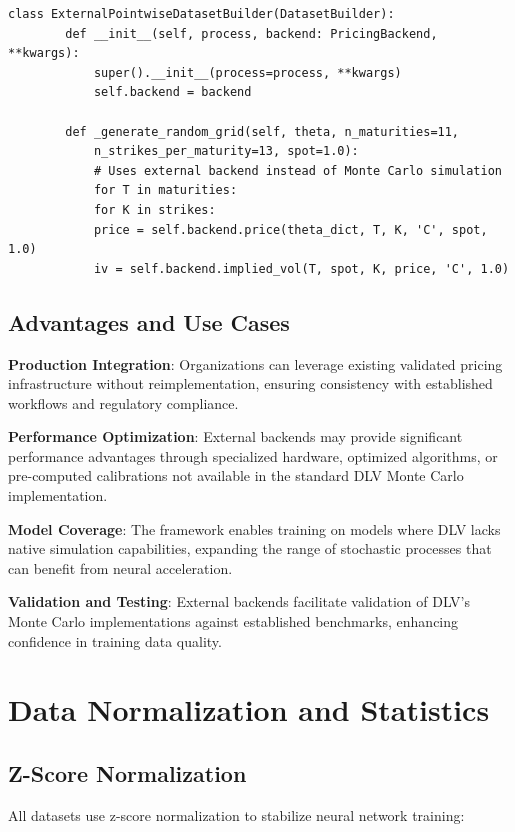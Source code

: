	\begin{lstlisting}[style=cleanpy]
		class ExternalPointwiseDatasetBuilder(DatasetBuilder):
		def __init__(self, process, backend: PricingBackend, **kwargs):
			super().__init__(process=process, **kwargs)
			self.backend = backend
		
		def _generate_random_grid(self, theta, n_maturities=11, 
			n_strikes_per_maturity=13, spot=1.0):
			# Uses external backend instead of Monte Carlo simulation
			for T in maturities:
			for K in strikes:
			price = self.backend.price(theta_dict, T, K, 'C', spot, 1.0)
			iv = self.backend.implied_vol(T, spot, K, price, 'C', 1.0)
	\end{lstlisting}
	
	\subsection{Advantages and Use Cases}
	
	\textbf{Production Integration}: Organizations can leverage existing validated pricing infrastructure without reimplementation, ensuring consistency with established workflows and regulatory compliance.
	
	\textbf{Performance Optimization}: External backends may provide significant performance advantages through specialized hardware, optimized algorithms, or pre-computed calibrations not available in the standard DLV Monte Carlo implementation.
	
	\textbf{Model Coverage}: The framework enables training on models where DLV lacks native simulation capabilities, expanding the range of stochastic processes that can benefit from neural acceleration.
	
	\textbf{Validation and Testing}: External backends facilitate validation of DLV's Monte Carlo implementations against established benchmarks, enhancing confidence in training data quality.
	
	
	\section{Data Normalization and Statistics}
	
	\subsection{Z-Score Normalization}\label{subsec:znorm}
	
	All datasets use z-score normalization to stabilize neural network training:
	
